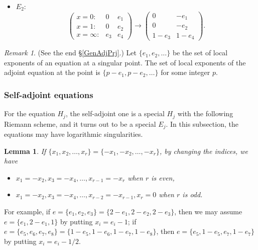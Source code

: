 \documentclass[a4paper,12pt]{article}
\newtheorem{lemma}[thm]{Lemma}
\theoremstyle{definition}
\theoremstyle{remark}
\newtheorem{remark}[thm]{Remark}
\numberwithin{equation}{section} %
\begin{document}
\begin{itemize}
{\[\begin{array}{l}
\begin{array}{cc}
    0&c-a-b\\
    a&b\end{array}\right) \\
\hskip60pt \to
\left( \begin{array}{cc}
    0&-(1-c)\\
    0&-(c-a-b)\\
    1-a&1-b\end{array}\right)=R_2(1-a,1-b,2-c).
  \end{array}
  \]%
}
\item  $E_2$:
\[
\left(\begin{array}{ccc}
x=0:&0&e_1\\
x=1:&0&e_2\\
x=\infty:&e_3&e_4\end{array}\right)\to
\left(\begin{array}{ccc}
0&-e_1\\
0&-e_2\\
1-e_3&1-e_4\end{array}\right).
\]    %
\end{itemize}

\begin{remark}\label{adjisminus}(See the end \S \ref{GenAdjPrj}.)
Let $\{e_1,e_2,\dots\}$ be the set of local exponents of an equation at a singular point. The set of local exponents of the adjoint equation at the point is   $\{p-e_1,p-e_2,\dots\}$ for some integer $p$.
\end{remark}

\subsubsection{Self-adjoint equations}
For the equation $H_j$, the self-adjoint one is a special $H_j$ with the following Riemann scheme, and it turns out to be a special $E_j$. In this subsection, the equations may have logarithmic singularities.
\begin{lemma}
If $\{x_1,x_2,\dots,x_r\}=\{-x_1,-x_2,\dots,-x_r\}$, by changing the indices, we have
\begin{itemize}
\item $x_1=-x_2,x_3=-x_4,\dots, x_{r-1}=-x_r$ when $r$ is even, 
\item $x_1=-x_2,x_3=-x_4,\dots, x_{r-2}=-x_{r-1},x_r=0$ when $r$ is odd.
\end{itemize}
\end{lemma}
 For example, %
if $e=\{e_1,e_2,e_3\}=\{2-e_1,2-e_2,2-e_3\}$, then
we may assume $e=\{e_1,2-e_1,1\}$ by putting $x_i=e_i -1$;
if $e=\{e_5,e_6,e_7,e_8\}=\{1-e_5,1-e_6,1-e_7,1-e_8\}$, then
$e=\{e_5,1-e_5,e_7,1-e_7\}$ by putting $x_i = e_i - 1/2$.
\end{document}
